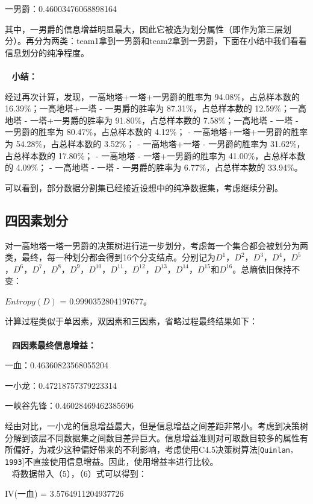 \documentclass[lang=cn,11pt]{elegantpaper}
\begin{document}
一男爵：0.46003476068898164

其中，一男爵的信息增益明显最大，因此它被选为划分属性（即作为第三层划分）。再分为两类：team1拿到一男爵和team2拿到一男爵，下面在小结中我们看看信息划分的纯净程度。\\
\\~
\textbf{小结：}

经过再次计算，发现，一高地塔+一塔+一男爵的胜率为 94.08$ \% $，占总样本数的 16.39$ \% $；一高地塔+一塔 - 一男爵的胜率为 87.31$ \% $，占总样本数的 12.59$ \% $；一高地塔 - 一塔+一男爵的胜率为 91.80$ \% $，占总样本数的 7.58$ \% $；一高地塔 - 一塔 - 一男爵的胜率为 80.47$ \% $，占总样本数的 4.12$ \% $； - 一高地塔+一塔+一男爵的胜率为 54.28$ \% $，占总样本数的 3.52$ \% $； - 一高地塔+一塔 - 一男爵的胜率为 31.62$ \% $，占总样本数的 17.80$ \% $； - 一高地塔 - 一塔+一男爵的胜率为 41.00$ \% $，占总样本数的 4.09$ \% $； - 一高地塔 - 一塔 - 一男爵的胜率为 6.77$ \% $，占总样本数的 33.94$ \% $。

可以看到，部分数据分割集已经接近设想中的纯净数据集，考虑继续分割。

\subsection{四因素划分}

对一高地塔一塔一男爵的决策树进行进一步划分，考虑每一个集合都会被划分为两类，最终，每一种划分都会得到16个分支结点。分别记为$D^1$，$D^2$，$D^3$，$D^4$，$D^5$，$D^6$，$D^7$，$D^8$，$D^9$，$D^{10}$，$D^{11}$，$D^{12}$，$D^{13}$，$D^{14}$，$D^{15}$和$D^{16}$。总熵依旧保持不变：

$Entropy(D)$  = 0.9990352804197677。

计算过程类似于单因素，双因素和三因素，省略过程最终结果如下：
\\~
\\~
\textbf{四因素最终信息增益：}

一血：0.46360823568055204

一小龙：0.47218757379223314

一峡谷先锋：0.46028469462385696

经由对比，一小龙的信息增益最大，但是信息增益之间差距非常小。考虑到决策树分解到该层不同数据集之间数目差异巨大。信息增益准则对可取数目较多的属性有所偏好，为减少这种偏好带来的不利影响，考虑使用C4.5决策树算法[\lstinline{Quinlan，1993}]不直接使用信息增益。因此，使用增益率进行比较。
\\~
将数据带入（5），（6）式可以得到：

IV(一血) = 3.5764911204937726
\end{document}
